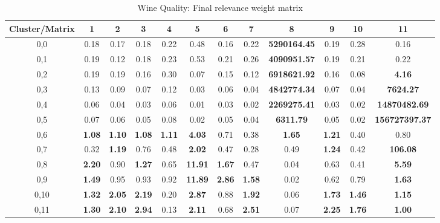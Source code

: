 \documentclass[10pt, conference, compsocconf]{IEEEtran}
\begin{document}
\begin{center}
\begin{table*}[ht]
\renewcommand{\arraystretch}{1.2}
\caption{Wine Quality: Final relevance weight matrix}
\label{winered_pesos}
\centering
\begin{tabular}{|c|c|c|c|c|c|c|c|c|c|c|c|}
\hline
Cluster/Matrix & 1 & 2 & 3 & 4 & 5 & 6 & 7 & 8 & 9 & 10 & 11 \\ \hline
0,0 & 0.18 & 0.17 & 0.18 & 0.22 & 0.48 & 0.16 & 0.22 & \textbf{5290164.45} & 0.19 & 0.28 & 0.16 \\ \hline
0,1 & 0.19 & 0.12 & 0.18 & 0.23 & 0.53 & 0.21 & 0.26 & \textbf{4090951.57} & 0.19 & 0.21 & 0.22 \\ \hline
0,2 & 0.19 & 0.19 & 0.16 & 0.30 & 0.07 & 0.15 & 0.12 & \textbf{6918621.92} & 0.16 & 0.08 & \textbf{4.16} \\ \hline
0,3 & 0.13 & 0.09 & 0.07 & 0.12 & 0.03 & 0.06 & 0.04 & \textbf{4842774.34} & 0.07 & 0.04 & \textbf{7624.27} \\ \hline
0,4 & 0.06 & 0.04 & 0.03 & 0.06 & 0.01 & 0.03 & 0.02 & \textbf{2269275.41} & 0.03 & 0.02 & \textbf{14870482.69} \\ \hline
0,5 & 0.07 & 0.06 & 0.05 & 0.08 & 0.02 & 0.05 & 0.04 & \textbf{6311.79} & 0.05 & 0.02 & \textbf{156727397.37} \\ \hline
0,6 & \textbf{1.08} & \textbf{1.10} & \textbf{1.08} & \textbf{1.11} & \textbf{4.03} & 0.71 & 0.38 & \textbf{1.65} & \textbf{1.21} & 0.40 & 0.80 \\ \hline
0,7 & 0.32 & \textbf{1.19} & 0.76 & 0.48 & \textbf{2.02} & 0.47 & 0.28 & 0.49 & \textbf{1.24} & 0.42 & \textbf{106.08} \\ \hline
0,8 & \textbf{2.20} & 0.90 & \textbf{1.27} & 0.65 & \textbf{11.91} & \textbf{1.67} & 0.47 & 0.04 & 0.63 & 0.41 & \textbf{5.59} \\ \hline
0,9 & \textbf{1.49} & 0.95 & 0.93 & 0.92 & \textbf{11.89} & \textbf{2.86} & \textbf{1.58} & 0.02 & 0.62 & 0.79 & \textbf{1.63} \\ \hline
0,10 & \textbf{1.32} & \textbf{2.05} & \textbf{2.19} & 0.20 & \textbf{2.87} & 0.88 & \textbf{1.92} & 0.06 & \textbf{1.73} & \textbf{1.46} & \textbf{1.15} \\ \hline
0,11 & \textbf{1.30} & \textbf{2.10} & \textbf{2.94} & 0.13 & \textbf{2.11} & 0.68 & \textbf{2.51} & 0.07 & \textbf{2.25} & \textbf{1.76} & \textbf{1.00} \\ \hline

\end{tabular}
\end{table*}
\end{center}
\end{document}
